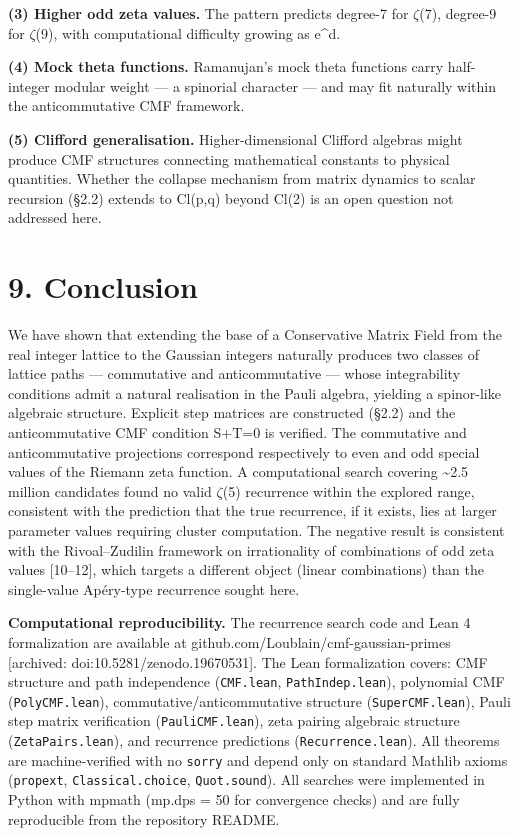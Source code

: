 \documentclass[11pt]{article}
\begin{document}
\textbf{(3) Higher odd zeta values.} The pattern predicts degree-7 for
\(\zeta\)(7), degree-9 for \(\zeta\)(9), with computational difficulty
growing as e\^{}d.

\textbf{(4) Mock theta functions.} Ramanujan's mock theta functions
carry half-integer modular weight --- a spinorial character --- and may
fit naturally within the anticommutative CMF framework.

\textbf{(5) Clifford generalisation.} Higher-dimensional Clifford
algebras might produce CMF structures connecting mathematical constants
to physical quantities. Whether the collapse mechanism from matrix
dynamics to scalar recursion (§2.2) extends to Cl(p,q) beyond Cl(2) is
an open question not addressed here.

\hypertarget{conclusion}{%
\section{9. Conclusion}\label{conclusion}}

We have shown that extending the base of a Conservative Matrix Field
from the real integer lattice to the Gaussian integers naturally
produces two classes of lattice paths --- commutative and
anticommutative --- whose integrability conditions admit a natural
realisation in the Pauli algebra, yielding a spinor-like algebraic
structure. Explicit step matrices are constructed (§2.2) and the
anticommutative CMF condition S+T=0 is verified. The commutative and
anticommutative projections correspond respectively to even and odd
special values of the Riemann zeta function. A computational search
covering \textasciitilde2.5 million candidates found no valid
\(\zeta\)(5) recurrence within the explored range, consistent with the
prediction that the true recurrence, if it exists, lies at larger
parameter values requiring cluster computation. The negative result is
consistent with the Rivoal--Zudilin framework on irrationality of
combinations of odd zeta values {[}10--12{]}, which targets a different
object (linear combinations) than the single-value Apéry-type recurrence
sought here.

\textbf{Computational reproducibility.} The recurrence search code and
Lean 4 formalization are available at
github.com/Loublain/cmf-gaussian-primes {[}archived:
doi:10.5281/zenodo.19670531{]}. The Lean formalization covers: CMF
structure and path independence (\texttt{CMF.lean},
\texttt{PathIndep.lean}), polynomial CMF (\texttt{PolyCMF.lean}),
commutative/anticommutative structure (\texttt{SuperCMF.lean}), Pauli
step matrix verification (\texttt{PauliCMF.lean}), zeta pairing
algebraic structure (\texttt{ZetaPairs.lean}), and recurrence
predictions (\texttt{Recurrence.lean}). All theorems are
machine-verified with no \texttt{sorry} and depend only on standard
Mathlib axioms (\texttt{propext}, \texttt{Classical.choice},
\texttt{Quot.sound}). All searches were implemented in Python with
mpmath (mp.dps = 50 for convergence checks) and are fully reproducible
from the repository README.
\end{document}
